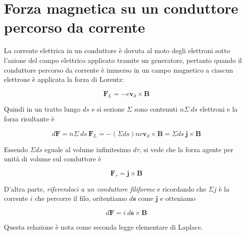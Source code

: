 \newpage

\section{Forza magnetica su un conduttore percorso da corrente}

La corrente elettrica in un conduttore è dovuta al moto degli elettroni sotto l'azione del campo elettrico applicato tramite un generatore, pertanto quando il conduttore percorso da corrente è immerso in un campo magnetico a ciascun elettrone è applicata la forza di Lorentz:

\begin{equation*}
    \mathbf{F}_L = - e \mathbf{v}_d \times \mathbf{B}
\end{equation*}

Quindi in un tratto lungo $d s$ e si sezione $\Sigma$ sono contenuti $n \Sigma \ ds$ elettroni e la forza risultante è 

\begin{equation*}
    d \mathbf{F} = n \Sigma \ ds \ \mathbf{F}_L = - (\Sigma ds) n e \mathbf{v}_d \times \mathbf{B} = \Sigma ds \ \mathbf{j} \times \mathbf{B}
\end{equation*}

Essendo $\Sigma ds$ eguale al volume infinitesimo $d\tau$, si vede che la forza agente per unità di volume sul conduttore è

\begin{tcolorbox}[colback=yellow!10!white, colframe=orange!70!black, boxrule=0.8pt]
\begin{equation}
    \mathbf{F}_{\tau} = \mathbf{j} \times \mathbf{B}
\end{equation}
\end{tcolorbox}

D'altra parte, \emph{riferendoci a un conduttore filiforme} e ricordando che $\Sigma j$ è la corrente $i$ che percorre il filo, oritentiamo $d \mathbf{s}$ come $\mathbf{j}$ e otteniamo 

\begin{tcolorbox}[colback=yellow!10!white, colframe=orange!70!black, boxrule=0.8pt]
\begin{equation} \label{eq:seconda_legge_elementare_Laplace}
    d \mathbf{F} = i \ d \mathbf{s} \times \mathbf{B}
\end{equation}
\end{tcolorbox}

Questa relazione è nota come seconda legge elementare di Laplace. \\

